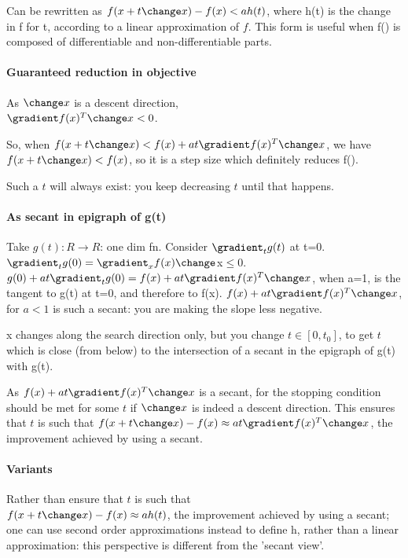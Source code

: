 \documentclass[oneside, article]{memoir}
\begin{document}
Can be rewritten as $f(x + t \change x)- f(x) < ah(t)$, where h(t) is the change in f for t, according to a linear approximation of $f$. This form is useful when f() is composed of differentiable and non-differentiable parts.

\paragraph*{Guaranteed reduction in objective}
As $\change x$ is a descent direction, \\
$\gradient f(x)^{T} \change x < 0$.

So, when $f(x + t \change x) < f(x) + at\gradient f(x)^{T} \change x$, we have $f(x + t \change x) < f(x)$, so it is a step size which definitely reduces f().

Such a $t$ will always exist: you keep decreasing $t$ until that happens.

\paragraph*{As secant in epigraph of g(t)}
Take $g(t):R \to R$: one dim fn. Consider $\gradient_t g(t)$ at t=0. 
$\gradient_t g(0) = \gradient_x f(x) \change $x$ \leq 0$. $g(0) + at\gradient_t g(0) = f(x) + at\gradient f(x)^{T} \change x$, when a=1, is the tangent to g(t) at t=0, and therefore to f(x). $f(x) + at\gradient f(x)^{T} \change x$, for $a<1$ is such a secant: you are making the slope less negative.

x changes along the search direction only, but you change $t \in [0, t_{0}]$, to get $t$ which is close (from below) to the intersection of a secant in the epigraph of g(t) with g(t).

As $f(x) + at\gradient f(x)^{T} \change x$ is a secant, for the stopping condition should be met for some $t$ if $\change x$ is indeed a descent direction. This ensures that $t$ is such that $f(x + t \change x) - f(x) \approx  at\gradient f(x)^{T} \change x$, the improvement achieved by using a secant.

\paragraph*{Variants}
Rather than ensure that $t$ is such that \\
$f(x + t \change x) - f(x) \approx  ah(t)$, the improvement achieved by using a secant; one can use second order approximations instead to define h, rather than a linear approximation: this perspective is different from the 'secant view'.
\end{document}
